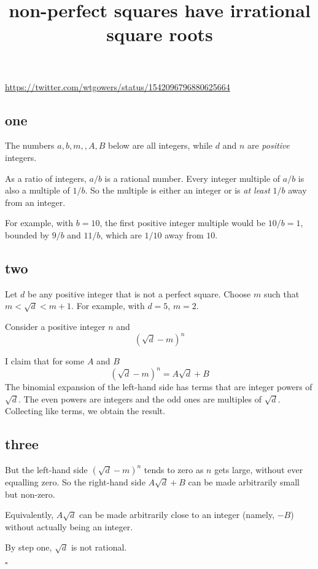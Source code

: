\documentclass[11pt, oneside]{article}
\title{non-perfect squares have irrational square roots}
\date{}
\begin{document}
\maketitle
\Large


\url{https://twitter.com/wtgowers/status/1542096796880625664}

\subsection*{one}

The numbers $a,b,m,,A,B$ below are all integers, while $d$ and $n$ are \emph{positive} integers.

As a ratio of integers, $a/b$ is a rational number.  Every integer multiple of $a/b$ is also a multiple of $1/b$.  So the multiple is either an integer or is \emph{at least} $1/b$ away from an integer.  

For example, with $b = 10$, the first positive integer multiple would be $10/b = 1$, bounded by $9/b$ and $11/b$, which are $1/10$ away from $10$.

\subsection*{two}

Let $d$ be any positive integer that is not a perfect square.  Choose $m$ such that $m < \sqrt{d} < m + 1$.  For example, with $d = 5$, $m = 2$.  

Consider a positive integer $n$ and
\[ (\sqrt{d} - m)^n \]

I claim that for some $A$ and $B$
\[ (\sqrt{d} - m)^n = A \sqrt{d} + B \]
The binomial expansion of the left-hand side has terms that are integer powers of $\sqrt{d}$.  The even powers are integers and the odd ones are multiples of $\sqrt{d}$.  Collecting like terms, we obtain the result.

\subsection*{three}

But the left-hand side $(\sqrt{d} - m)^n$ tends to zero as $n$ gets large, without ever equalling zero.  So the right-hand side $A \sqrt{d} + B$ can be made arbitrarily small but non-zero.

Equivalently, $A \sqrt{d}$ can be made arbitrarily close to an integer (namely, $-B$) without actually being an integer.  

By step one, $\sqrt{d}$ is not rational.

$\square$
\end{document}
